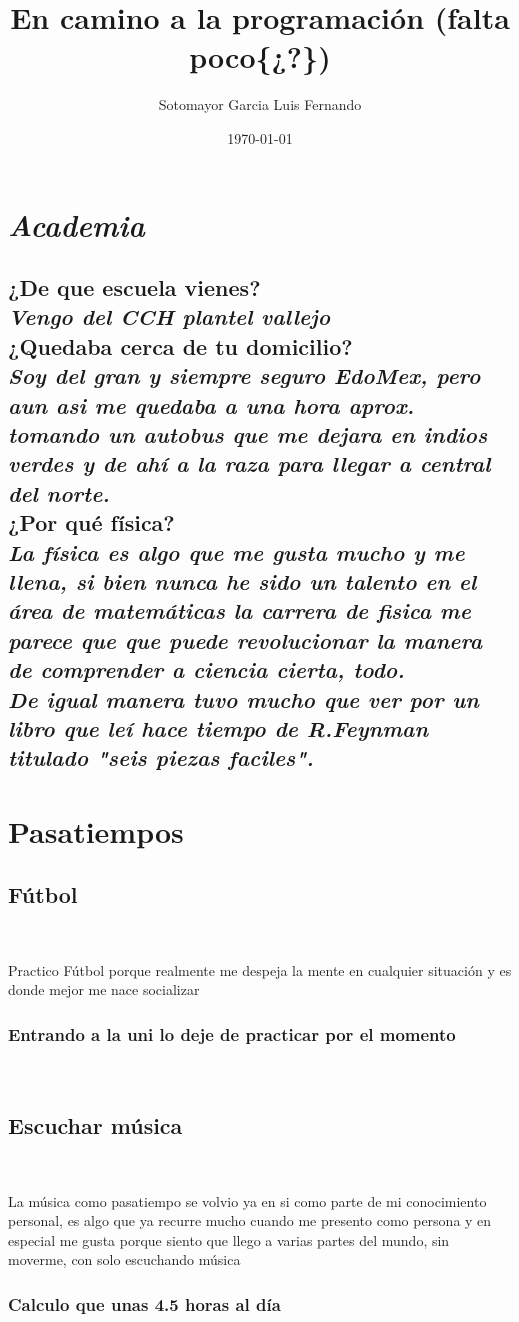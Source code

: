 \documentclass{article}
\title{En camino a la programación (falta poco\{¿?\})}
\author{Sotomayor Garcia Luis Fernando }
\date{\today}
\begin{document}
\maketitle

\section{\emph{Academia}}
  \subsection{{\Large{¿De que escuela vienes?}}\\
   \large{{{\it{Vengo del CCH plantel vallejo}}}\\ {{\Large{¿Quedaba cerca de tu domicilio?}}\\ \it{Soy del gran y siempre seguro EdoMex, pero aun asi me quedaba a una hora aprox. tomando un autobus que me dejara en indios verdes y de ah\'i a la raza para llegar a central del norte.}}}\\
  {{\Large{¿Por qu\'e f\'isica?}}}\\ 
 \it{La f\'isica es algo que me gusta mucho y me llena, si bien nunca he sido un talento en el \'area de matem\'aticas la carrera de fisica me parece que que puede revolucionar la manera de comprender a ciencia cierta, todo.\\
 De igual manera tuvo mucho que ver por un libro que le\'i hace tiempo de R.Feynman titulado "seis piezas faciles".}}

 
 \section{Pasatiempos}
   \subsection{F\'utbol}\\
   \large{{{\textmd{Practico F\'utbol porque realmente me despeja la mente en cualquier situaci\'on y es donde mejor me nace socializar}}}
    \subsubsection{Entrando a la uni lo deje de practicar por el momento}\\}
   
   \subsection{Escuchar m\'usica}\\
   \large{{{\textmd{La m\'usica como pasatiempo se volvio ya en si como parte de mi conocimiento personal, es algo que ya recurre mucho cuando me presento como persona y en especial me gusta porque siento que llego a varias partes del mundo, sin moverme, con solo escuchando m\'usica}}}
   \subsubsection{Calculo que unas 4.5 horas al d\'ia}\\}
   
\end{document}
